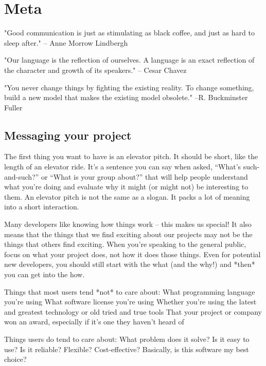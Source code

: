 \chapter{Meta}
"Good communication is just as stimulating as black coffee, and just as hard to sleep after." -- Anne Morrow Lindbergh

"Our language is the reflection of ourselves. A language is an exact reflection of the character and growth of its speakers." -- Cesar Chavez
 
"You never change things by fighting the existing reality. To change something, build a new model that makes the existing model obsolete." --R. Buckminster Fuller

\section{Messaging your project}
The first thing you want to have is an elevator pitch. It should be short, like the length of an elevator ride. It’s a sentence you can say when asked, “What’s such-and-such?” or “What is your group about?” that will help people understand what you’re doing and evaluate why it might (or might not) be interesting to them. An elevator pitch is not the same as a slogan. It packs a lot of meaning into a short interaction.  

Many developers like knowing how things work -- this makes us special! It also means that the things that we find exciting about our projects may not be the things that others find exciting. When you’re speaking to the general public, focus on what your project does, not how it does those things. Even for potential new developers, you should still start with the what (and the why!) and *then* you can get into the how.  

Things that most users tend *not* to care about:
What programming language you're using
What software license you're using
Whether you're using the latest and greatest technology or old tried and true tools
That your project or company won an award, especially if it's one they haven't heard of

Things users do tend to care about:
What problem does it solve?
Is it easy to use?
Is it reliable? Flexible? Cost-effective?
Basically, is this software my best choice?

